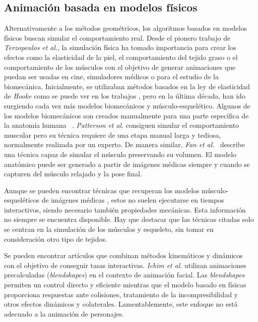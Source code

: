 \subsection{Animación basada en modelos físicos}

Alternativamente a los métodos geométricos, los algoritmos basados en modelos físicos buscan simular el comportamiento real. Desde el pionero trabajo de \emph{Terzopoulos et al.}\cite{terzopoulos1987elastically}, la simulación física ha tomado importancia para crear los efectos como la elasticidad de la piel, el comportamiento del tejido graso o el comportamiento de los músculos con el objetivo de generar animaciones que puedan ser usadas en cine, simuladores médicos o para el estudio de la biomecánica. 
Inicialmente, se utilizaban métodos basados en la ley de elasticidad de \emph{Hooke} como se puede ver en los trabajos \cite{russell93,wilhelms1995modeling}, pero en la última década, han ido surgiendo cada vez más modelos biomecánicos y músculo-esquelético. Algunos de los modelos biomecánicos son creados manualmente para una parte específica de la anatomía humana ~\cite{Lee2009}. \emph{Patterson et al.} \cite{Patterson2012} consiguen simular el comportamiento muscular pero su técnica requiere de una etapa manual larga y tediosa, normalmente realizada por un experto. De manera similar, \emph{Fan et al.}~ \cite{Fan2014} describe una técnica capaz de simular el músculo preservando su volumen. El modelo anatómico puede ser generado a partir de imágenes médicas siempre y cuando se capturen del músculo relajado y la pose final. 

Aunque se pueden encontrar técnicas que recuperan los modelos músculo-esqueléticos de imágenes médicas \cite{blemker2007, gilles2010, schmid2009}, estos no suelen ejecutarse en tiempos interactivos, siendo necesario también propiedades mecánicas. Esta información no siempre se encuentra disponible. Hay que destacar que las técnicas citadas solo se centran en la simulación de los músculos y esqueleto, sin tomar en consideración otro tipo de tejidos.

Se pueden encontrar artículos que combinan métodos kinemáticos y dinámicos con el objetivo de conseguir tasas interactivas.  \emph{Ichim et al.} \cite{Ichim:2016} utilizan animaciones precalculadas (\emph{blendshapes}) en el contexto de animación facial. Las \emph{blendshapes} permiten un control directo y eficiente mientras que el modelo basado en físicas proporciona respuestas ante colisiones, tratamiento de la incompresibilidad y otros efectos dinámicos y colaterales. Lamentablemente, este enfoque no está adecuado a la animación de personajes. 


